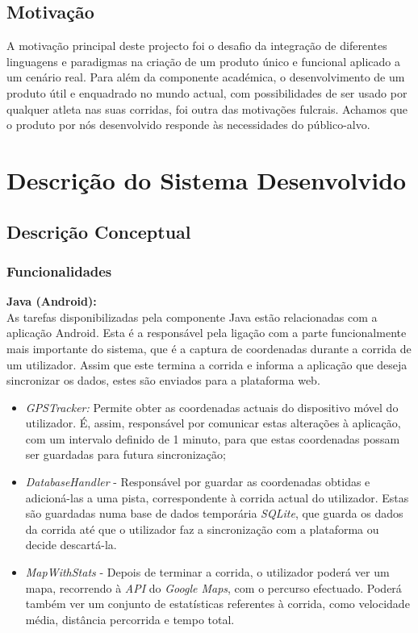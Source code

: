 \documentclass[15pt,a4paper]{article}
\begin{document}
\subsection{Motivação}

A motivação principal deste projecto foi o desafio da integração de diferentes linguagens e paradigmas na criação de um produto único e funcional aplicado a um cenário real. 
Para além da componente académica, o desenvolvimento de um produto útil e enquadrado no mundo actual, com possibilidades de ser usado por qualquer atleta nas suas corridas, foi outra das motivações fulcrais. Achamos que o produto por nós desenvolvido responde às necessidades do público-alvo.


\newpage
\section{Descrição do Sistema Desenvolvido}

\subsection{Descrição Conceptual}

\subsubsection{Funcionalidades}

\textbf{Java (Android):}
\\

As tarefas disponibilizadas pela componente Java estão relacionadas com a aplicação Android. Esta é a responsável pela ligação com a parte funcionalmente mais importante do sistema, que é a captura de coordenadas durante a corrida de um utilizador. Assim que este termina a corrida e informa a aplicação que deseja sincronizar os dados, estes são enviados para a plataforma web.

\begin{itemize}
  \item \textit{GPSTracker:} Permite obter as coordenadas actuais do dispositivo móvel do utilizador. É, assim, responsável por comunicar estas alterações à aplicação, com um intervalo definido de 1 minuto, para que estas coordenadas possam ser guardadas para futura sincronização;

 \item \textit{DatabaseHandler} - Responsável por guardar as coordenadas obtidas e adicioná-las a uma pista, correspondente à corrida actual do utilizador. Estas são guardadas numa base de dados temporária  \textit{SQLite}, que guarda os dados da corrida até que o utilizador faz a sincronização com a plataforma ou decide descartá-la. 

 \item \textit{MapWithStats} - Depois de terminar a corrida, o utilizador poderá ver um mapa, recorrendo à  \textit{API }do \textit{Google Maps}, com o percurso efectuado. Poderá também ver um conjunto de estatísticas referentes à corrida, como velocidade média, distância percorrida e tempo total.

\end{itemize}
 
\end{document}
